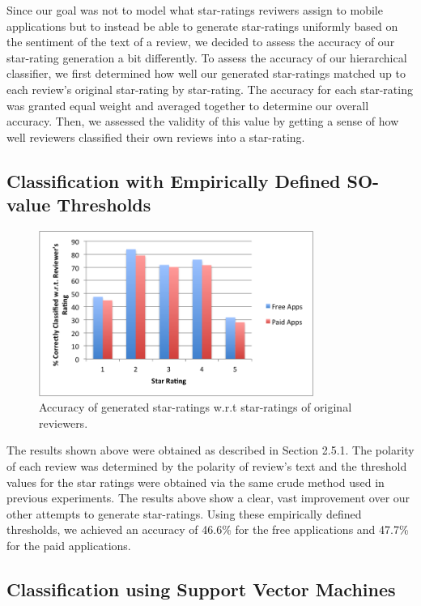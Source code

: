 \documentclass[11pt]{report} %
\begin{document}
Since our goal was not to model what star-ratings reviwers assign to mobile applications but to instead be able to generate star-ratings uniformly based on the sentiment of the text of a review, we decided to assess the accuracy of our star-rating generation a bit differently. To assess the accuracy of our hierarchical classifier, we first determined how well our generated star-ratings matched up to each review's original star-rating by star-rating. The accuracy for each star-rating was granted equal weight and averaged together to determine our overall accuracy. Then, we assessed the validity of this value by getting a sense of how well reviewers classified their own reviews into a star-rating.


\subsection{Classification with Empirically Defined SO-value Thresholds}
\label{subsection:empirically_defined_so}
\begin{figure}[H]
	\centering
	\includegraphics[width=0.8\textwidth]{data/pmi-cue-accuracy.png}
	\caption{Accuracy of generated star-ratings w.r.t star-ratings of original reviewers.}
	\label{fig:pmi-cue-acc}
	\end{figure}

The results shown above were obtained as described in Section 2.5.1. The polarity of each review was determined by the polarity of review's text and the threshold values for the star ratings were obtained via the same crude method used in previous experiments. The results above show a clear, vast improvement over our other attempts to generate star-ratings. Using these empirically defined thresholds, we achieved  an accuracy of 46.6\% for the free applications and 47.7\% for the paid applications.  

\newpage

		\subsection{Classification using Support Vector Machines}
\end{document}
